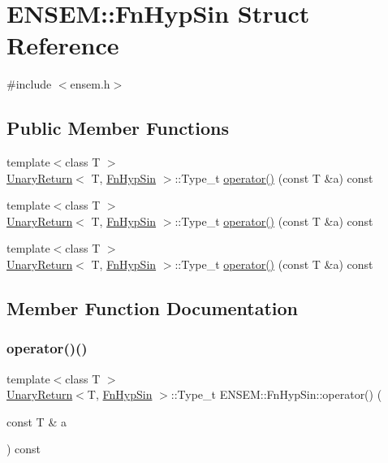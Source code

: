 \hypertarget{structENSEM_1_1FnHypSin}{}\section{E\+N\+S\+EM\+:\+:Fn\+Hyp\+Sin Struct Reference}
\label{structENSEM_1_1FnHypSin}


{\ttfamily \#include $<$ensem.\+h$>$}

\subsection*{Public Member Functions}
\begin{DoxyCompactItemize}
\item 
{\footnotesize template$<$class T $>$ }\\\mbox{\hyperlink{structENSEM_1_1UnaryReturn}{Unary\+Return}}$<$ T, \mbox{\hyperlink{structENSEM_1_1FnHypSin}{Fn\+Hyp\+Sin}} $>$\+::Type\+\_\+t \mbox{\hyperlink{structENSEM_1_1FnHypSin_a21db44c9d0efe64e1e59ceae24fc7d48}{operator()}} (const T \&a) const
\item 
{\footnotesize template$<$class T $>$ }\\\mbox{\hyperlink{structENSEM_1_1UnaryReturn}{Unary\+Return}}$<$ T, \mbox{\hyperlink{structENSEM_1_1FnHypSin}{Fn\+Hyp\+Sin}} $>$\+::Type\+\_\+t \mbox{\hyperlink{structENSEM_1_1FnHypSin_a21db44c9d0efe64e1e59ceae24fc7d48}{operator()}} (const T \&a) const
\item 
{\footnotesize template$<$class T $>$ }\\\mbox{\hyperlink{structENSEM_1_1UnaryReturn}{Unary\+Return}}$<$ T, \mbox{\hyperlink{structENSEM_1_1FnHypSin}{Fn\+Hyp\+Sin}} $>$\+::Type\+\_\+t \mbox{\hyperlink{structENSEM_1_1FnHypSin_a21db44c9d0efe64e1e59ceae24fc7d48}{operator()}} (const T \&a) const
\end{DoxyCompactItemize}


\subsection{Member Function Documentation}
\mbox{\label{structENSEM_1_1FnHypSin_a21db44c9d0efe64e1e59ceae24fc7d48}} 
\subsubsection{\texorpdfstring{operator()()}{operator()()}\hspace{0.1cm}{\footnotesize\ttfamily [1/3]}}
{\footnotesize\ttfamily template$<$class T $>$ \\
\mbox{\hyperlink{structENSEM_1_1UnaryReturn}{Unary\+Return}}$<$T, \mbox{\hyperlink{structENSEM_1_1FnHypSin}{Fn\+Hyp\+Sin}} $>$\+::Type\+\_\+t E\+N\+S\+E\+M\+::\+Fn\+Hyp\+Sin\+::operator() (\begin{DoxyParamCaption}\item[{const T \&}]{a }\end{DoxyParamCaption}) const\hspace{0.3cm}{\ttfamily [inline]}}

